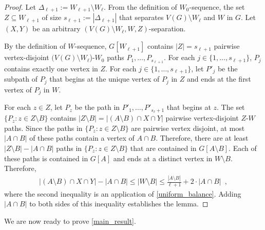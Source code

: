 \documentclass{patmorin}
\begin{document}
\begin{proof}
  Let $\Delta_{\ell+1}:=W_{\ell+1}\setminus W_\ell$.
  From the definition of $W_0$-sequence, the set $Z\subseteq W_{\ell+1}$ of size $s_{\ell+1}:=|\Delta_{\ell+1}|$ that separates $V(G)\setminus W_\ell$ and $W$ in $G$.  Let $(X,Y)$ be an arbitrary $(V(G)\setminus W_\ell, W,Z)$-separation.

  By the definition of $W$-sequence, $G[W_{\ell+1}]$ contains $|Z|=s_{\ell+1}$ pairwise vertex-disjoint $(V(G)\setminus W_{\ell}$)-$W_0$ paths $P_1,\ldots,P_{s_{\ell+1}}$. 
  For each $j\in\{1,\ldots,s_{\ell+1}\}$, $P_j$ contains exactly one vertex in $Z$.  For each $j\in\{1,\ldots,s_{\ell+1}\}$, let $P'_j$ be the subpath of $P_j$ that begins at the unique vertex of $P_j$ in $Z$ and ends at the first vertex of $P_j$ in $W$.  

  For each $z\in Z$, let $P_z$ be the path in $P'_1,\ldots,P'_{s_\ell+1}$ that begins at $z$. 
  The set $\{P_z:z\in Z\setminus B\}$ contains $|Z\setminus B|=|(A\setminus B)\cap X\cap Y|$ pairwise vertex-disjoint $Z$-$W$ paths.
  Since the paths in $\{P_z:z\in Z\setminus B\}$ are pairwise vertex disjoint, at most $|A\cap B|$ of these paths contain a vertex of $A\cap B$. Therefore, there are at least $|Z\setminus B|-|A\cap B|$ paths in $\{P_z:z\in Z\setminus B\}$ that are contained in $G[A\setminus B]$.  Each of these paths is contained in $G[A]$ and ends at a distinct vertex in $W\setminus B$.  Therefore,
  \begin{align*}
     |(A\setminus B)\cap X\cap Y|-|A\cap B| \le |W\setminus B| \le
     \frac{|A\setminus B|}{\ell+1}+2\cdot |A\cap B| \enspace ,  
  \end{align*}
  where the second inequality is an application of \cref{uniform_balance}.  Adding $|A\cap B|$ to both sides of this inequality establishes the lemma.
\end{proof}

We are now ready to prove \cref{main_result}.
\end{document}
